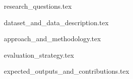 \documentclass[a4paper,11pt]{report}
\begin{document}
	


\pagebreak
\tableofcontents
\pagebreak

\setcounter{page}{1}

{research_questions.tex}

{dataset_and_data_description.tex}

{approach_and_methodology.tex}

{evaluation_strategy.tex}

{expected_outputs_and_contributions.tex}

\newpage

\printbibliography[title={References}, heading=bibsection]
\end{document}
